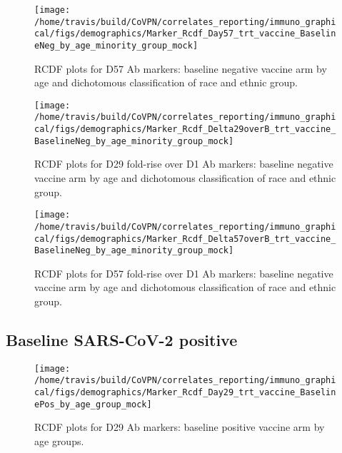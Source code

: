 \documentclass[]{book}
\theoremstyle{definition}
\theoremstyle{definition}
\theoremstyle{definition}
\newcommand{\1}{\mathbbm{1}}
\begin{document}
\begin{figure}[H]

{\centering \texttt{[image: /home/travis/build/CoVPN/correlates\_reporting/immuno\_graphical/figs/demographics/Marker\_Rcdf\_Day57\_trt\_vaccine\_BaselineNeg\_by\_age\_minority\_group\_mock]} 

}

\caption{RCDF plots for D57 Ab markers: baseline negative vaccine arm by age and dichotomous classification of race and ethnic group.}\label{fig:unnamed-chunk-89}
\end{figure}

\begin{figure}[H]

{\centering \texttt{[image: /home/travis/build/CoVPN/correlates\_reporting/immuno\_graphical/figs/demographics/Marker\_Rcdf\_Delta29overB\_trt\_vaccine\_BaselineNeg\_by\_age\_minority\_group\_mock]} 

}

\caption{RCDF plots for D29 fold-rise over D1 Ab markers: baseline negative vaccine arm by age and dichotomous classification of race and ethnic group.}\label{fig:unnamed-chunk-90}
\end{figure}

\begin{figure}[H]

{\centering \texttt{[image: /home/travis/build/CoVPN/correlates\_reporting/immuno\_graphical/figs/demographics/Marker\_Rcdf\_Delta57overB\_trt\_vaccine\_BaselineNeg\_by\_age\_minority\_group\_mock]} 

}

\caption{RCDF plots for D57 fold-rise over D1 Ab markers: baseline negative vaccine arm by age and dichotomous classification of race and ethnic group.}\label{fig:unnamed-chunk-91}
\end{figure}

\hypertarget{baseline-sars-cov-2-positive-4}{%
\subsection{Baseline SARS-CoV-2 positive}\label{baseline-sars-cov-2-positive-4}}

\begin{figure}[H]

{\centering \texttt{[image: /home/travis/build/CoVPN/correlates\_reporting/immuno\_graphical/figs/demographics/Marker\_Rcdf\_Day29\_trt\_vaccine\_BaselinePos\_by\_age\_group\_mock]} 

}

\caption{RCDF plots for D29 Ab markers: baseline positive vaccine arm by age groups.}\label{fig:unnamed-chunk-92}
\end{figure}
\end{document}

